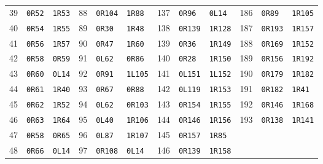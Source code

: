 \begin{center}
\begin{tabular}{rll@{\qquad}rll@{\qquad}rll@{\qquad}rll}
39 & \texttt{0R52} & \texttt{1R53} & 88 & \texttt{0R104} & \texttt{1R88} & 137 & \texttt{0R96} & \texttt{0L14} & 186 & \texttt{0R89} & \texttt{1R105}\\
40 & \texttt{0R54} & \texttt{1R55} & 89 & \texttt{0R30} & \texttt{1R48} & 138 & \texttt{0R139} & \texttt{1R128} & 187 & \texttt{0R193} & \texttt{1R157}\\
41 & \texttt{0R56} & \texttt{1R57} & 90 & \texttt{0R47} & \texttt{1R60} & 139 & \texttt{0R36} & \texttt{1R149} & 188 & \texttt{0R169} & \texttt{1R152}\\
42 & \texttt{0R58} & \texttt{0R59} & 91 & \texttt{0L62} & \texttt{0R86} & 140 & \texttt{0R28} & \texttt{1R150} & 189 & \texttt{0R156} & \texttt{1R192}\\
43 & \texttt{0R60} & \texttt{0L14} & 92 & \texttt{0R91} & \texttt{1L105} & 141 & \texttt{0L151} & \texttt{1L152} & 190 & \texttt{0R179} & \texttt{1R182}\\
44 & \texttt{0R61} & \texttt{1R40} & 93 & \texttt{0R67} & \texttt{0R88} & 142 & \texttt{0L119} & \texttt{1R153} & 191 & \texttt{0R182} & \texttt{1R41}\\
45 & \texttt{0R62} & \texttt{1R52} & 94 & \texttt{0L62} & \texttt{0R103} & 143 & \texttt{0R154} & \texttt{1R155} & 192 & \texttt{0R146} & \texttt{1R168}\\
46 & \texttt{0R63} & \texttt{1R64} & 95 & \texttt{0L40} & \texttt{1R106} & 144 & \texttt{0R146} & \texttt{1R156} & 193 & \texttt{0R138} & \texttt{1R141}\\
47 & \texttt{0R58} & \texttt{0R65} & 96 & \texttt{0L87} & \texttt{1R107} & 145 & \texttt{0R157} & \texttt{1R85} &  &  & \\
48 & \texttt{0R66} & \texttt{0L14} & 97 & \texttt{0R108} & \texttt{0L14} & 146 & \texttt{0R139} & \texttt{1R158} &  &  & \\
\bottomrule
\end{tabular}
\endgroup
\end{center}
\clearpage
